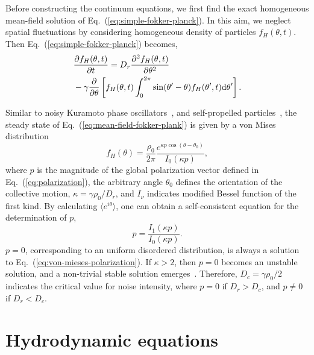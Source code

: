\documentclass[reprint,floatfix,amsmath,amssymb,aps,pre,showkeys,showpacs,superscriptaddress]{revtex4-1}
\newcommand{\Dif}[2]{\frac{\partial #1}{\partial #2}}
\newcommand{\ave}[1]{\langle #1 \rangle}
\newcommand{\p}{p}
\newcommand{\dd}{{\rm d}}
\newcommand{\req}[1]{Eq.~(\ref{#1})}
\begin{document}
Before constructing the continuum equations, we first find the exact homogeneous mean-field  solution of \req{eq:simple-fokker-planck}. In this aim, we neglect spatial fluctuations by considering homogeneous density of particles $f_H(\theta,t)$. Then \req{eq:simple-fokker-planck} becomes,
\begin{equation}
\begin{aligned}
&\Dif{{f}_H (\theta,t)}{t} = D_r \frac{\partial^2 f_H(\theta,t)}{\partial \theta^2} \\
&-\gamma \frac{\partial}{\partial \theta} \left[f_H(\theta,t) \int_0^{2\pi} \sin(\theta^\prime - \theta) f_H(\theta^\prime,t) \dd \theta^\prime \right].
\end{aligned}
\label{eq:mean-field-fokker-plank}
\end{equation}

Similar to noisy Kuramoto phase oscillators~\cite{Shinomoto1986phase,Sakaguchi1988phase}, and self-propelled particles~\cite{peruani2008mean,Grossmann2013}, the steady state of \req{eq:mean-field-fokker-plank} is given by a von Mises distribution
\begin{equation}
f_H(\theta) = \frac{\rho_0}{2 \pi} \frac{e^{\kappa \p \cos(\theta - \theta_0)}}{I_0(\kappa \p)},
\label{eq:von-mieses}
\end{equation}
where $\p$ is the magnitude of the global polarization vector defined in \req{eq:polarization}, the arbitrary angle $\theta_0$ defines the orientation of the collective motion, $\kappa=\gamma \rho_0 / D_r$, and $I_{\nu}$ indicates modified Bessel function of the first kind. By calculating $\ave{e^{i \theta}}$, one can obtain a self-consistent equation for the determination of $p$,
\begin{equation}
\p = \frac{I_1(\kappa \p)}{I_0(\kappa \p)}.
\label{eq:von-mieses-polarization}
\end{equation}
$\p = 0$, corresponding to an uniform disordered distribution, is always a solution to \req{eq:von-mieses-polarization}. If $\kappa > 2$, then $\p=0$ becomes an unstable solution, and a non-trivial stable solution emerges~\cite{Shinomoto1986phase,Sakaguchi1988phase}. Therefore, $D_c = \gamma \rho_0 / 2$ indicates the critical value for noise intensity, where $\p=0$ if $D_r > D_c$, and $\p \neq 0$ if $D_r < D_c$.

\section{Hydrodynamic equations}
\label{section:hydrodynamics}
\end{document}
